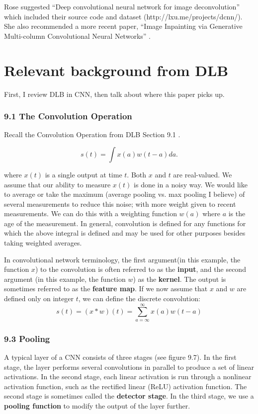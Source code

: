 \documentclass[12pt]{article}
\begin{document}
Rose suggested ``Deep convolutional neural network for image deconvolution''
\cite{xu2014deep} which included their source code and dataset
(http://lxu.me/projects/dcnn/). She also recommended a more
recent paper, ``Image Inpainting via Generative Multi-column Convolutional Neural Networks'' \cite{wang2018image}.

\section{Relevant background from DLB}

First, I review DLB in CNN, then talk about where this paper
picks up.

\subsubsection*{9.1 The Convolution Operation}

Recall the Convolution Operation from DLB Section 9.1
\cite{Goodfellow-et-al-2016}.

\[
s(t) = \int x(a)w(t-a) da. \tag{9.1}
\]

where $x(t)$ is a single output at time $t$. Both $x$ and $t$
are real-valued. We assume that our ability to measure $x(t)$
is done in a noisy way. We would like to average or take the
maximum (average pooling vs. max pooling I believe) of several
measurements to reduce this noise; with more weight given to
recent measurements. We can do this with a weighting
function $w(a)$ where $a$ is the age of the measurement. In
general, convolution is defined for any functions for which the
above integral is defined and may be used for other purposes besides
taking weighted averages. \newline

In convolutional network terminology, the first argument(in this
example, the function $x$) to the convolution is often referred
to as the \textbf{input}, and the second argument (in this
example, the function $w$) as the \textbf{kernel}. The output is
sometimes referred to as the \textbf{feature map}. If we now
assume that $x$ and $w$ are defined only on integer $t$, we can
define the discrete convolution:
\[
s(t) = (x * w)(t) = \sum_{a=\infty}^{\infty} x(a)w(t-a) \tag{9.3}
\]

\subsubsection*{9.3 Pooling}

A typical layer of a CNN consists of three stages (see figure 9.7). In
the first stage, the layer performs several convolutions in parallel to
produce a set of linear activations. In the second stage, each linear
activation is run through a nonlinear activation function, such as the
rectified linear (ReLU) activation function. The second stage is sometimes
called the \textbf{detector stage}. In the third stage, we use a
\textbf{pooling function} to modify the output of the layer further.
\end{document}
